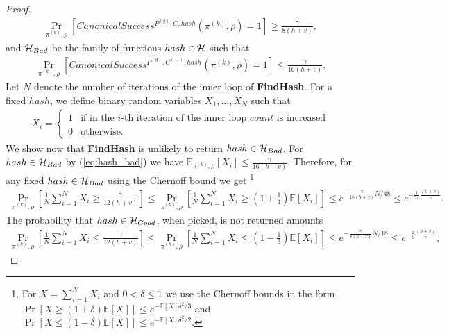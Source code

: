 \begin{proof}
\begin{align}
  \label{eq:hash_good}
\underset{\pi^{(k)}, \rho}{\Pr}\left[CanonicalSuccess^{P^{(g)}, C, hash}(\pi^{(k)}, \rho) = 1\right] \geq \frac{\gamma}{8(h+v)},
\end{align}
and $\mathcal{H}_{Bad}$ be the family of functions $hash \in \mathcal{H}$ such that
\begin{align}
  \label{eq:hash_bad}
\underset{\pi^{(k)}, \rho}{\Pr}\left[CanonicalSuccess^{P^{(g)}, C^{(\cdot, \cdot)}, hash}(\pi^{(k)}, \rho) = 1\right] \leq \frac{\gamma}{16(h+v)}.
\end{align}
%
Let $N$ denote the number of iterations of the inner loop of \textbf{FindHash}.
For a fixed $hash$, we define binary random variables $X_1, \dots, X_{N}$ such that
\begin{align*}
  X_i =
  \begin{cases}
    1 & \text{if in the $i$-th iteration of the inner loop $count$ is increased}\\
    0 & \text{otherwise.}
  \end{cases}
\end{align*}
We show now that \textbf{FindHash} is unlikely to return $hash \in \mathcal{H}_{Bad}$.
For $hash \in \mathcal{H}_{Bad}$ by (\ref{eq:hash_bad}) we have $\mathbb{E}_{\pi^{(k)},\rho}[X_i] \leq \frac{\gamma}{16(h+v)}$.
Therefore, for any fixed $hash \in \mathcal{H}_{Bad}$ using the Chernoff bound we get
\footnote{For $X = \sum_{i=1}^N X_i$ and $0 < \delta \leq 1$ we use the Chernoff bounds in the form
$\Pr[X \geq (1+\delta) \mathbb{E}[X]] \leq e^{- \mathbb{E}[X] \delta^2/3}$ and
$\Pr[X \leq (1-\delta) \mathbb{E}[X]] \leq e^{- \mathbb{E}[X] \delta^2/2}$.}
\begin{align*}
  \underset{\pi^{(k)},\rho}{\Pr} \left[\frac{1}{N} \sum_{i=1}^{N} X_i \geq \frac{\gamma}{12(h+v)} \right] \leq
  \underset{\pi^{(k)}, \rho}{\Pr}\left[\frac{1}{N} \sum_{i=1}^{N} X_i \geq (1 + \frac{1}{4}) \mathbb{E}[X_i]\right] \leq
  e^{-{\frac{\gamma}{16(h+v)}} N /48} \leq e^{-\frac{1}{24}\frac{(h+v)}{\gamma}}.
\end{align*}
%
The probability that $hash \in \mathcal{H}_{Good}$, when picked, is not returned amounts
\begin{align*}
  \underset{\pi^{(k)}, \rho}{\Pr}\left[\frac{1}{N} \sum_{i=1}^{N} X_i \leq \frac{\gamma}{12(h+v)}\right] \leq
  \underset{\pi^{(k)}, \rho}{\Pr}\left[\frac{1}{N} \sum_{i=1}^{N} X_i \leq (1 - \frac{1}{3})\mathbb{E}[X_i]\right]
  \leq e^{-{\frac{\gamma}{8(h+v)}} N / 18} \leq e^{-\frac{2}{9} \frac{(h+v)}{\gamma}},
\end{align*}

\end{proof}
